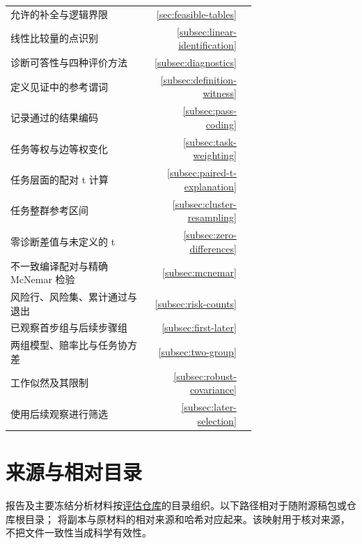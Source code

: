 \begin{longtable}{p{0.70\linewidth}rr}
允许的补全与逻辑界限 & \ref{sec:feasible-tables} & \pageref{sec:feasible-tables} \\
线性比较量的点识别 & \ref{subsec:linear-identification} & \pageref{subsec:linear-identification} \\
诊断可答性与四种评价方法 & \ref{subsec:diagnostics} & \pageref{subsec:diagnostics} \\
定义见证中的参考谓词 & \ref{subsec:definition-witness} & \pageref{subsec:definition-witness} \\
记录通过的结果编码 & \ref{subsec:pass-coding} & \pageref{subsec:pass-coding} \\
任务等权与边等权变化 & \ref{subsec:task-weighting} & \pageref{subsec:task-weighting} \\
任务层面的配对 t 计算 & \ref{subsec:paired-t-explanation} & \pageref{subsec:paired-t-explanation} \\
任务整群参考区间 & \ref{subsec:cluster-resampling} & \pageref{subsec:cluster-resampling} \\
零诊断差值与未定义的 t & \ref{subsec:zero-differences} & \pageref{subsec:zero-differences} \\
不一致编译配对与精确 McNemar 检验 & \ref{subsec:mcnemar} & \pageref{subsec:mcnemar} \\
风险行、风险集、累计通过与退出 & \ref{subsec:risk-counts} & \pageref{subsec:risk-counts} \\
已观察首步组与后续步骤组 & \ref{subsec:first-later} & \pageref{subsec:first-later} \\
两组模型、赔率比与任务协方差 & \ref{subsec:two-group} & \pageref{subsec:two-group} \\
工作似然及其限制 & \ref{subsec:robust-covariance} & \pageref{subsec:robust-covariance} \\
使用后续观察进行筛选 & \ref{subsec:later-selection} & \pageref{subsec:later-selection} \\
\end{longtable}
\normalsize
\section{来源与相对目录}
\label{sec:sources}
报告及主要冻结分析材料按\href{https://github.com/Kind-NK-Hill/review-history-evaluation}{评估仓库}的目录组织。以下路径相对于随附源稿包或仓库根目录； 将副本与原材料的相对来源和哈希对应起来。该映射用于核对来源，不把文件一致性当成科学有效性。

